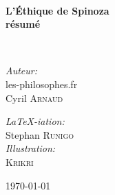 \begin{titlepage}
\textsc{\Large }\\[0.5cm]

\HRule

\begin{center}
{\huge \bfseries  L'Éthique de Spinoza\\
résumé\\[0.4cm] }
\end{center}

\HRule \\[1.5cm]

\vfill


\begin{minipage}{0.4\textwidth}
\begin{flushleft} \large
\emph{Auteur:}\\
les-philosophes.fr\\
Cyril \textsc{Arnaud}
\end{flushleft}
\end{minipage}
\begin{minipage}{0.4\textwidth}
\begin{flushright} \large
\emph{LaTeX-iation:}\\
Stephan \textsc{Runigo}\\
\emph{Illustration:}\\
\textsc{Krikri}
\end{flushright}
\end{minipage}

\vfill

{\large \today}

\end{titlepage}
